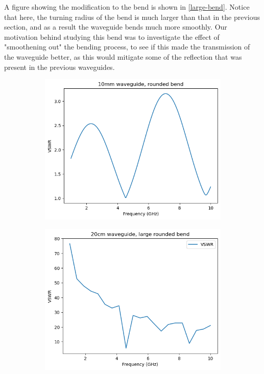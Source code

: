 A figure showing the modification to the bend is shown in \cref{large-bend}. Notice that here, the turning
radius of the bend is much larger than that in the previous section, and as a result the waveguide bends much
more smoothly. Our motivation behind studying this bend was to investigate the effect of "smoothening out"
the bending process, to see if this made the transmission of the waveguide better, as this would mitigate
some of the reflection that was present in the previous waveguides. 

\begin{figure}
	\centering
	\begin{subfigure}{0.4\textwidth}
		\includegraphics[scale=0.5]{images/plots/short-finitecond-round-big.png}
		\caption{}
		\label{short-finitecond-bend-round-big}
	\end{subfigure}
	\hspace{2cm}
	\begin{subfigure}{0.4\textwidth}
		\includegraphics[scale=0.5]{images/plots/long-finitecond-round-big.png}

\end{subfigure}
\end{figure}
